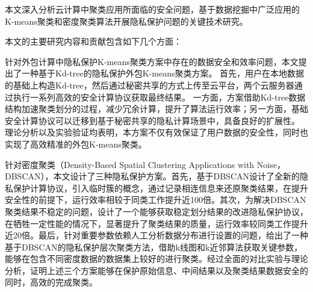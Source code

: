 \begin{cabstract}
本文深入分析云计算中聚类应用所面临的安全问题，基于数据挖掘中广泛应用的K-means聚类和密度聚类算法开展隐私保护问题的关键技术研究。

本文的主要研究内容和贡献包含如下几个方面：
\begin{compactenum}
\item 针对外包计算中隐私保护K-means聚类方案中存在的数据安全和效率问题，本文提出了一种基于Kd-tree的隐私保护外包K-means聚类方案。
首先，用户在本地数据的基础上构造Kd-tree，然后通过秘密共享的方式上传至云平台，两个云服务器通过执行一系列高效的安全计算协议获取最终结果。
一方面，方案借助Kd-tree数据结构加速聚类划分的过程，减少冗余计算，提升了算法运行效率；另一方面，基础安全计算协议可以迁移到基于秘密共享的隐私计算场景中，具备良好的扩展性。
理论分析以及实验验证均表明，本方案不仅有效保证了用户数据的安全性，同时也实现了高效精准的外包K-means聚类。

\item 针对密度聚类（Density-Based Spatial Clustering Applications with Noise，DBSCAN），本文设计了三种隐私保护方案。首先，基于DBSCAN设计了全新的隐私保护计算协议，引入临时簇的概念，通过记录相连信息来还原聚类结果，在提升安全性的前提下，运行效率相较于同类工作提升近100倍。其次，为解决DBSCAN聚类结果不稳定的问题，设计了一个能够获取稳定划分结果的改进隐私保护协议，在牺牲一定性能的情况下，显著提升了聚类结果的质量，运行效率较同类工作提升近20倍。最后，针对重要参数依赖人工分析数据分布进行设置的问题，给出了一种基于DBSCAN的隐私保护层次聚类方法，借助k线图和k近邻算法获取关键参数，能够在包含不同密度数据的数据集上较好的进行聚类。经过全面的对比实验与理论分析，证明上述三个方案能够在保护原始信息、中间结果以及聚类结果数据安全的同时，高效的完成聚类。   
\end{compactenum}                                               
\end{cabstract}

